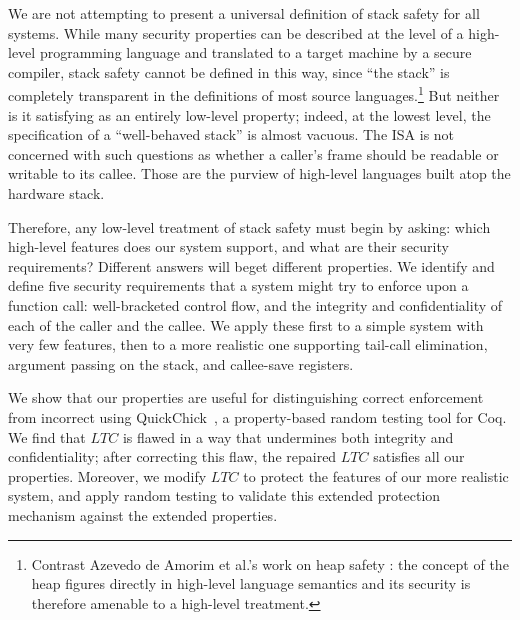 \documentclass[10pt,conference]{ieeetran}%
\theoremstyle{definition}
\begin{document}

We are not attempting to present a universal definition of stack safety
for all systems. While many security properties can be described at
the level of a high-level programming language and translated to a
target machine by a secure compiler, stack safety cannot be defined in
this way, since ``the stack'' is completely transparent in the
definitions of most source languages.\footnote{Contrast Azevedo de
  Amorim et al.'s work on heap safety
  \cite{DBLP:conf/post/AmorimHP18}: the concept of the heap figures
  directly in high-level language semantics and its security is
  therefore amenable to a high-level treatment.}
%
But neither is it satisfying as an entirely low-level property;
indeed, at the lowest level, the specification of a ``well-behaved
stack'' is almost vacuous. The ISA is not concerned with such
questions as whether a caller's frame should be readable or writable
to its callee. Those are the purview of high-level languages built
atop the hardware stack.

Therefore, any low-level treatment of stack safety must begin by asking:
which high-level features does our system support, and what are their
security requirements? Different answers will beget different properties.
We identify and define five security requirements that a system might try
to enforce upon a function call: well-bracketed control flow, and the
integrity and confidentiality of each of the caller and the callee.
We apply these first to a simple system
with very few features, then to a more realistic one supporting
tail-call elimination, argument passing on the stack, and callee-save
registers.

We show that our properties are useful for distinguishing correct enforcement
from incorrect using QuickChick~\cite{Denes:VSL2014,Pierce:SF4}, a property-based
random testing tool for Coq.
We find that \(LTC\) is flawed in
a way that undermines both integrity and confidentiality; after
correcting this flaw, the repaired \(LTC\) satisfies all our
properties.  Moreover, we modify \(LTC\) to protect the features of
our more realistic system, and apply
random testing to validate this extended protection mechanism against
the extended properties.
\end{document}
